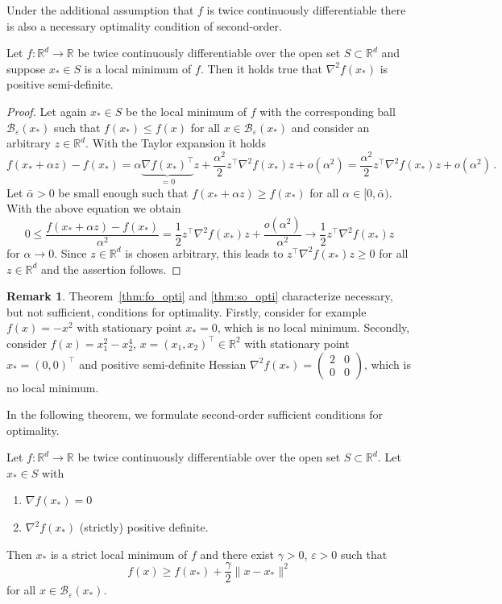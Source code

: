 \documentclass[12pt,openany]{book}
\theoremstyle{definition}
\newtheorem{remark}[thm]{Remark}
\theoremstyle{definition}
\newcommand{\R}{\mathbb{R}}
\begin{document}
Under the additional assumption that $f$ is twice continuously differentiable there is also a necessary optimality condition of second-order.

\begin{thm}\label{thm:so_opti}
Let $f:\R^d\to \R$ be twice continuously differentiable over the open set $S\subset \R^d$ and suppose $x_\ast \in S$ is a local minimum of $f$. Then it holds true that $\nabla^2 f(x_\ast)$ is positive semi-definite. 
\end{thm}
\begin{proof}
Let again $x_\ast\in S$ be the local minimum of $f$ with the corresponding ball $\mathcal B_\varepsilon(x_\ast)$ such that $f(x_\ast)\le f(x)$ for all $x\in\mathcal B_\varepsilon(x_\ast)$ and consider an arbitrary $z\in\R^d$. With the Taylor expansion it holds
\[f(x_\ast+\alpha z)-f(x_\ast) = \alpha \underbrace{\nabla f(x_\ast)^\top}_{=0} z + \frac{\alpha^2}{2} z^\top \nabla^2 f(x_\ast) z + o(\alpha^2) =   \frac{\alpha^2}{2} z^\top \nabla^2 f(x_\ast) z + o(\alpha^2)\, . \]
Let $\bar\alpha>0$ be small enough such that $f(x_\ast + \alpha z) \ge f(x_\ast)$ for all $\alpha\in [0,\bar\alpha)$. With the above equation we obtain
\[0\le \frac{f(x_\ast+\alpha z)-f(x_\ast)}{\alpha^2} = \frac{1}{2} z^\top \nabla^2 f(x_\ast) z + \frac{o(\alpha^2)}{\alpha^2}\to \frac{1}{2} z^\top \nabla^2 f(x_\ast) z \]
for $\alpha\to 0$. Since $z\in\R^d$ is chosen arbitrary, this leads to $z^\top \nabla^2 f(x_\ast) z\ge 0$ for all $z\in\R^d$ and the assertion follows.
\end{proof}

\begin{remark}
Theorem~\ref{thm:fo_opti} and \ref{thm:so_opti} characterize necessary, but not sufficient, conditions for optimality. Firstly, consider for example $f(x) = -x^2$ with stationary point $x_\ast = 0$, which is no local minimum.  Secondly, consider $f(x) = x_1^2-x_2^4$, $x=(x_1,x_2)^\top\in\R^2$ with stationary point $x_\ast = (0,0)^\top$ and positive semi-definite Hessian $\nabla^2 f(x_\ast) = \begin{pmatrix} 2 & 0 \\ 0 & 0 \end{pmatrix}$, which is no local minimum. 
\end{remark}

In the following theorem, we formulate second-order sufficient conditions for optimality.
\begin{thm}\label{thm:so_suff_opti}
Let $f:\R^d\to \R$ be twice continuously differentiable over the open set $S\subset \R^d$. Let $x_\ast\in S$ with 
\begin{enumerate}
\item $\nabla f(x_\ast) = 0$
\item $\nabla^2 f(x_\ast)$ (strictly) positive definite.
\end{enumerate}
Then $x_\ast$ is a strict local minimum of $f$ and there exist $\gamma>0$, $\varepsilon>0$ such that
\[f(x)\ge f(x_\ast) + \frac{\gamma}{2}\|x-x_\ast\|^2 \]
for all $x\in\mathcal B_{\varepsilon}(x_\ast)$.
\end{thm}
\end{document}
